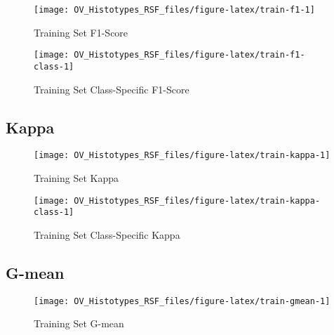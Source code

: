 \documentclass[
]{report}
\begin{document}
\begin{figure}[H]

{\centering \texttt{[image: OV\_Histotypes\_RSF\_files/figure-latex/train-f1-1]} 

}

\caption{Training Set F1-Score}\label{fig:train-f1}
\end{figure}

\begin{figure}[H]

{\centering \texttt{[image: OV\_Histotypes\_RSF\_files/figure-latex/train-f1-class-1]} 

}

\caption{Training Set Class-Specific F1-Score}\label{fig:train-f1-class}
\end{figure}

\hypertarget{kappa}{%
\subsection{Kappa}\label{kappa}}

\begin{figure}[H]

{\centering \texttt{[image: OV\_Histotypes\_RSF\_files/figure-latex/train-kappa-1]} 

}

\caption{Training Set Kappa}\label{fig:train-kappa}
\end{figure}

\begin{figure}[H]

{\centering \texttt{[image: OV\_Histotypes\_RSF\_files/figure-latex/train-kappa-class-1]} 

}

\caption{Training Set Class-Specific Kappa}\label{fig:train-kappa-class}
\end{figure}

\hypertarget{g-mean}{%
\subsection{G-mean}\label{g-mean}}

\begin{figure}[H]

{\centering \texttt{[image: OV\_Histotypes\_RSF\_files/figure-latex/train-gmean-1]} 

}

\caption{Training Set G-mean}\label{fig:train-gmean}
\end{figure}
\end{document}
